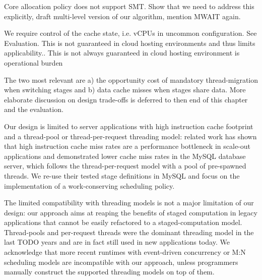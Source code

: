 \documentclass[12pt,a4paper]{book}
\begin{document}
Core allocation policy does not support SMT. Show that we need to address this explicitly, draft multi-level version of our algorithm, mention MWAIT again.

We require control of the cache state, i.e. vCPUs in uncommon configuration. See Evaluation.
This is not guaranteed in cloud hosting environments and thus limits applicability.. This is not always guaranteed in cloud hosting environment is operational burden 

The two most relevant are a) the opportunity cost of mandatory thread-migration when switching stages and b) data cache misses when stages share data.
More elaborate discussion on design trade-offs is deferred to then end of this chapter and the evaluation.


Our design is limited to server applications with high instruction cache footprint and a thread-pool or thread-per-request threading model:
related work has shown that high instruction cache miss rates are a performance bottleneck in scale-out applications
and demonstrated lower cache miss rates in the MySQL database server, which follows the thread-per-request model with a pool of pre-spawned threads.
We re-use their tested stage definitions in MySQL  and focus on the implementation of a work-conserving scheduling policy.
\cite{kanev2015profiling,mysqlThreading}

The limited compatibility with threading models is not a major limitation of our design:
our approach aims at reaping the benefits of staged computation in legacy applications that cannot be easily refactored to a staged-computation model.
Thread-pools and per-request threads were the dominant threading model in the last TODO years and are in fact still used in new applications today.
We acknowledge that more recent runtimes with event-driven concurrency or M:N scheduling models are incompatible with our approach, unless programmers manually construct the supported threading models on top of them.
\end{document}
